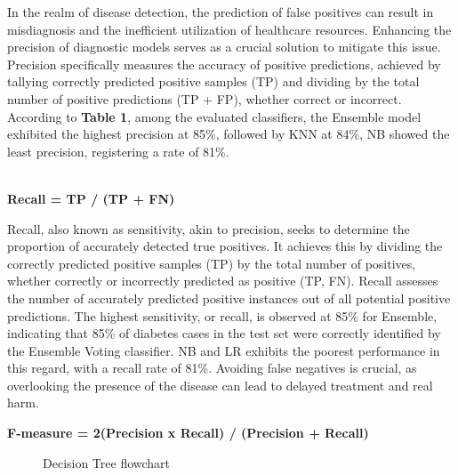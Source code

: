 \documentclass[11pt]{article}
\begin{document}
In the realm of disease detection, the prediction of false positives can result in misdiagnosis and the inefficient utilization of healthcare resources. Enhancing the precision of diagnostic models serves as a crucial solution to mitigate this issue. Precision specifically measures the accuracy of positive predictions, achieved by tallying correctly predicted positive samples (TP) and dividing by the total number of positive predictions (TP + FP), whether correct or incorrect. According to \textbf{Table 1}, among the evaluated classifiers, the Ensemble model exhibited the highest precision at 85\%, followed by KNN at 84\%, NB showed the least precision, registering a rate of 81\%.
\\ \\

\begin{center}
\textbf{Recall = TP / (TP + FN)}
\end{center}

Recall, also known as sensitivity, akin to precision, seeks to determine the proportion of accurately detected true positives. It achieves this by dividing the correctly predicted positive samples (TP) by the total number of positives, whether correctly or incorrectly predicted as positive (TP, FN). Recall assesses the number of accurately predicted positive instances out of all potential positive predictions. The highest sensitivity, or recall, is observed at 85\% for Ensemble, indicating that 85\% of diabetes cases in the test set were correctly identified by the Ensemble Voting classifier. NB and LR exhibits the poorest performance in this regard, with a recall rate of 81\%. Avoiding false negatives is crucial, as overlooking the presence of the disease can lead to delayed treatment and real harm.



\begin{center}
\textbf{F-measure = 2(Precision x Recall) / (Precision + Recall)}
\end{center}

\begin{figure}[h]
\begin{center}
\end{center}
\caption{Decision Tree flowchart}
\label{experiment1fitness}
\end{figure}
\end{document}
